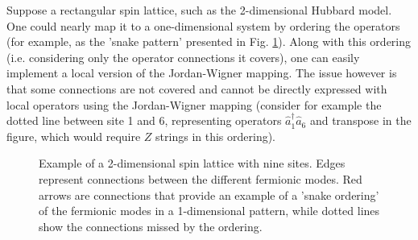 Suppose a rectangular spin lattice, such as the 2-dimensional Hubbard model. One could nearly map it to a one-dimensional system by ordering the operators (for example, as the 'snake pattern' presented in Fig. \ref{fig:nine_site_lattice}). Along with this ordering (i.e. considering only the operator connections it covers), one can easily implement a local version of the Jordan-Wigner mapping. The issue however is that some connections are not covered and cannot be directly expressed with local operators using the Jordan-Wigner mapping (consider for example the dotted line between site 1 and 6, representing operators $\hat{a}^{\dagger}_1 \hat{a}_6$ and transpose in the figure, which would require $Z$ strings in this ordering).

\begin{figure} [h]
\centering
{}
\caption{Example of a 2-dimensional spin lattice with nine sites. Edges represent connections between the different fermionic modes. Red arrows are connections that provide an example of a 'snake ordering' of the fermionic modes in a 1-dimensional pattern, while dotted lines show the connections missed by the ordering.}
\label{fig:nine_site_lattice}
\end{figure}

